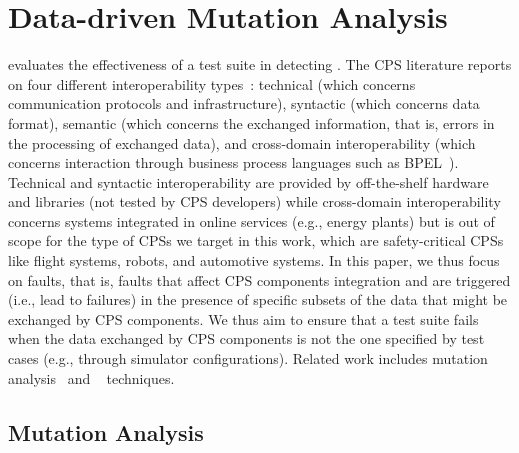 
\section{Data-driven Mutation Analysis}

 evaluates the effectiveness of a test suite in detecting . The CPS literature reports on four different interoperability types~\cite{Givehchi:2017}: technical (which concerns communication protocols and  infrastructure), syntactic (which concerns data format), semantic (which concerns the exchanged information, that is, errors in the processing of exchanged data), and cross-domain interoperability (which concerns interaction through business process languages such as BPEL~\cite{BPEL}).
Technical and syntactic interoperability are provided by off-the-shelf hardware and libraries
(not tested by CPS developers)
 while cross-domain interoperability concerns systems integrated in online services (e.g., energy plants) but is out of scope for the type of CPSs we target in this work, which are safety-critical CPSs like flight systems, robots, and automotive systems. In this paper, we thus focus on  faults,
 that is, faults that affect CPS components integration and are triggered (i.e., lead to failures) in the presence of specific subsets of the data that might be exchanged by CPS components. We thus aim to ensure that a test suite fails when the data exchanged by CPS components is not the one specified by test cases (e.g., through simulator configurations).
Related work includes mutation analysis~\cite{jia2010analysis,papadakis2019mutation} and ~\cite{natella2016assessing} techniques.

\subsection{Mutation Analysis}


